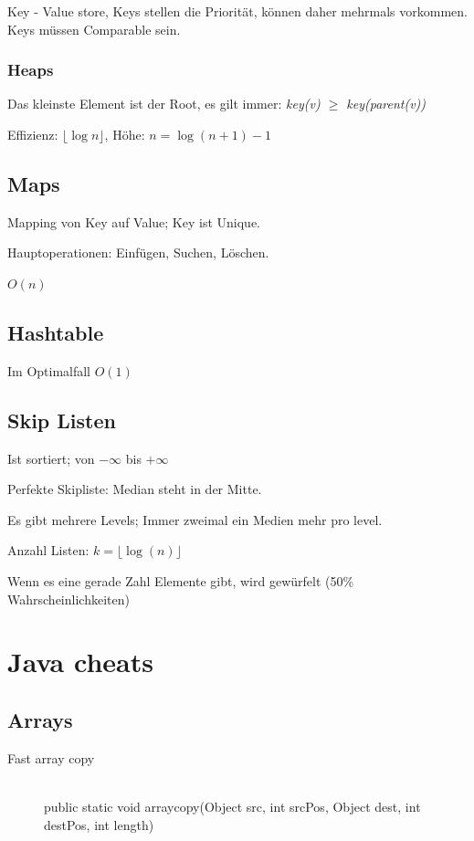 Key - Value store, Keys stellen die Priorität, können daher mehrmals vorkommen. Keys müssen Comparable sein.


\subsubsection{Heaps}

Das kleinste Element ist der Root, es gilt immer: \textit{key(v) $\geq$ key(parent(v))}

Effizienz: $\lfloor \log n \rfloor$, Höhe: $n = \log(n+1) - 1$



\subsection{Maps}

Mapping von Key auf Value; Key ist Unique.

Hauptoperationen: Einfügen, Suchen, Löschen.

$O(n)$

\subsection{Hashtable}

Im Optimalfall $O(1)$


\subsection{Skip Listen}

Ist sortiert; von $-\infty$ bis $+\infty$


Perfekte Skipliste: Median steht in der Mitte.

Es gibt mehrere Levels; Immer zweimal ein Medien mehr pro level.

Anzahl Listen: $k= \lfloor\log(n)\rfloor$

Wenn es eine gerade Zahl Elemente gibt, wird gewürfelt (50\% Wahrscheinlichkeiten)

\section{Java cheats}
\subsection{Arrays}
\begin{description}
	
	\item[Fast array copy] \hfill \\
		public static void arraycopy(Object src, int srcPos, Object dest, int destPos, int length)

\end{description}
